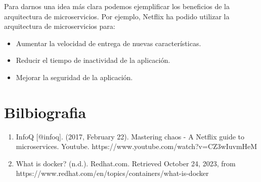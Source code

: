 \documentclass{dense_template}
\begin{document}
Para darnos una idea más clara podemos ejemplificar los beneficios de la arquitectura de microservicios. Por ejemplo, Netflix ha podido utilizar la arquitectura de microservicios para:
\begin{itemize}
    \item Aumentar la velocidad de entrega de nuevas características.
    \item Reducir el tiempo de inactividad de la aplicación.
    \item Mejorar la seguridad de la aplicación.
\end{itemize}
\pagebreak
\section{Bilbiografia}
\sloppy
\begin{enumerate}
    \item InfoQ [@infoq]. (2017, February 22). Mastering chaos - A Netflix guide to microservices. Youtube. https://www.youtube.com/watch?v=CZ3wIuvmHeM
    \item What is docker? (n.d.). Redhat.com. Retrieved October 24, 2023, from https://www.redhat.com/en/topics/containers/what-is-docker
\end{enumerate}
\end{document}
